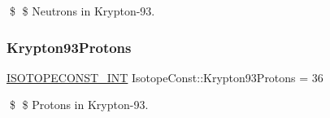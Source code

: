 \$ \$ Neutrons in Krypton-\/93. \mbox{\label{group___isotope_const-_krypton-_kr93_ga0ee4a7f8ffd25daf11d9f96339dfe742}} 
\subsubsection{\texorpdfstring{Krypton93\+Protons}{Krypton93Protons}}
{\footnotesize\ttfamily \mbox{\hyperlink{group___isotope_const-_macros_ga5f18360b3e99483a35c32d789e62621c}{I\+S\+O\+T\+O\+P\+E\+C\+O\+N\+S\+T\+\_\+\+I\+NT}} Isotope\+Const\+::\+Krypton93\+Protons = 36}

\$ \$ Protons in Krypton-\/93. 